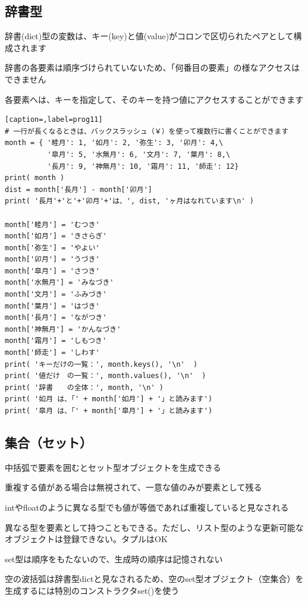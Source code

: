\documentclass[uplatex,a4paper,11pt,oneside,openany]{jsbook}
\begin{document}
\subsection{辞書型}

辞書(dict)型の変数は、キー(key)と値(value)がコロンで区切られたペアとして構成されます

辞書の各要素は順序づけられていないため、「何番目の要素」の様なアクセスはできません

各要素へは、キーを指定して、そのキーを持つ値にアクセスすることができます

\begin{lstlisting}[caption=,label=prog11]
# 一行が長くなるときは、バックスラッシュ（￥）を使って複数行に書くことができます
month = { '睦月': 1, '如月': 2, '弥生': 3, '卯月': 4,\
          '皐月': 5, '水無月': 6, '文月': 7, '葉月': 8,\
          '長月': 9, '神無月': 10, '霜月': 11, '師走': 12}
print( month )
dist = month['長月'] - month['卯月']
print( '長月'+'と'+'卯月'+'は、', dist, 'ヶ月はなれています\n' )

month['睦月'] = 'むつき'
month['如月'] = 'きさらぎ'
month['弥生'] = 'やよい'
month['卯月'] = 'うづき'
month['皐月'] = 'さつき'
month['水無月'] = 'みなづき'
month['文月'] = 'ふみづき'
month['葉月'] = 'はづき'
month['長月'] = 'ながつき'
month['神無月'] = 'かんなづき'
month['霜月'] = 'しもつき'
month['師走'] = 'しわす'
print( 'キーだけの一覧：', month.keys(), '\n'  )
print( '値だけ　の一覧：', month.values(), '\n'  )
print( '辞書　　の全体：', month, '\n' )
print( '如月 は、「' + month['如月'] + '」と読みます')
print( '皐月 は、「' + month['皐月'] + '」と読みます')
\end{lstlisting}%

\subsection{集合（セット）}

中括弧{}で要素を囲むとセット型オブジェクトを生成できる

重複する値がある場合は無視されて、一意な値のみが要素として残る

intやfloatのように異なる型でも値が等価であれば重複していると見なされる

異なる型を要素として持つこともできる。ただし、リスト型のような更新可能なオブジェクトは登録できない。タプルはOK

set型は順序をもたないので、生成時の順序は記憶されない

空の波括弧{}は辞書型dictと見なされるため、空のset型オブジェクト（空集合）を生成するには特別のコンストラクタset()を使う
\end{document}
